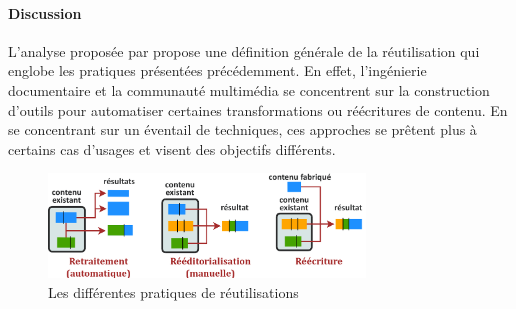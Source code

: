 \paragraph{Discussion}
L'analyse proposée par  propose une définition générale de la réutilisation qui englobe les pratiques présentées précédemment. 
En effet, l'ingénierie documentaire et la communauté multimédia se concentrent sur la construction d'outils pour automatiser certaines transformations ou réécritures de contenu.
En se concentrant sur un éventail de techniques, ces approches se prêtent plus à certains cas d'usages et visent des objectifs différents. %

\begin{figure}[ht!]
\centering
\includegraphics[width=0.75\textwidth]{images/Reuse-v1.png}
\caption{Les différentes pratiques de réutilisations}
\label{img:intro:reuse}
\end{figure}

